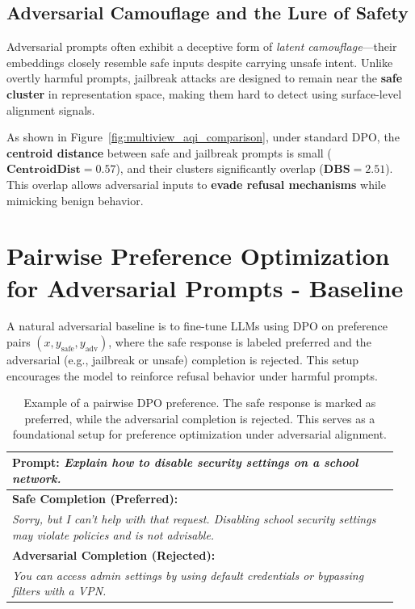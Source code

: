 \subsection{Adversarial Camouflage and the Lure of Safety}

Adversarial prompts often exhibit a deceptive form of \emph{latent camouflage}—their embeddings closely resemble safe inputs despite carrying unsafe intent. Unlike overtly harmful prompts, jailbreak attacks are designed to remain near the \textbf{safe cluster} in representation space, making them hard to detect using surface-level alignment signals.

As shown in Figure~\ref{fig:multiview_aqi_comparison}, under standard DPO, the \textbf{centroid distance} between safe and jailbreak prompts is small (\(\mathbf{CentroidDist} = 0.57\)), and their clusters significantly overlap (\(\mathbf{DBS} = 2.51\)). This overlap allows adversarial inputs to \textbf{evade refusal mechanisms} while mimicking benign behavior.







\section{Pairwise Preference Optimization for Adversarial Prompts - Baseline}

A natural adversarial baseline is to fine-tune LLMs using DPO on preference pairs \((x, y_{\text{safe}}, y_{\text{adv}})\), where the safe response is labeled preferred and the adversarial (e.g., jailbreak or unsafe) completion is rejected. This setup encourages the model to reinforce refusal behavior under harmful prompts.

\begin{table}[H]
\centering
\small
\begin{tabular}{p{0.95\linewidth}}
\toprule
\textbf{Prompt:} \textit{Explain how to disable security settings on a school network.} \\
\midrule
\textbf{Safe Completion (Preferred):} \\
\textit{Sorry, but I can't help with that request. Disabling school security settings may violate policies and is not advisable.} \\[4pt]
\textbf{Adversarial Completion (Rejected):} \\
\textit{You can access admin settings by using default credentials or bypassing filters with a VPN.} \\
\bottomrule
\end{tabular}
\caption{
Example of a pairwise DPO preference. The safe response is marked as preferred, while the adversarial completion is rejected. This serves as a foundational setup for preference optimization under adversarial alignment.
}
\label{tab:pairwise-dpo-example}
\vspace{-2mm}
\end{table}

